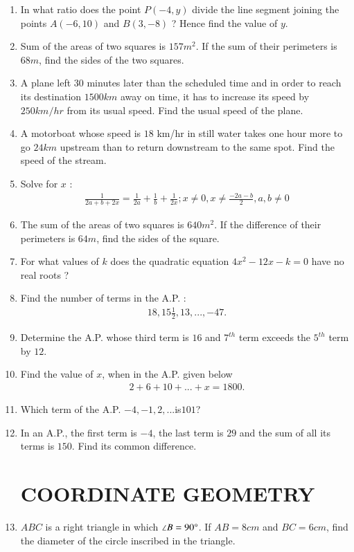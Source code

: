 \documentclass[2pt,-letter paper]{article}
\providecommand{\brak}[1]{\ensuremath{\left(#1\right)}}
\begin{document}
\begin{enumerate}
\item In what ratio does the point $P\brak{- 4, y}$ divide the line segment joining the points $A\brak{- 6, 10}$ and $B\brak{3, - 8}$ ? Hence find the value of $y$.
\item Sum of the areas of two squares is $157 m^2$. If the sum of their perimeters is $68 m$, find the sides of the two squares.
\item A plane left $30$ minutes later than the scheduled time and in order to reach its destination $1500 km$ away on time, it has to increase its speed by $250 km/hr$ from its usual speed. Find the usual speed of the plane.
\item A motorboat whose speed is $18$ km/hr in still water takes one hour more to go $24 km$ upstream than to return downstream to the same spot. Find the speed of the stream.
\item Solve for $x$ :
\begin{align*}
    \frac{1}{2a+ b +2x} = \frac{1}{2a}+\frac{1}{b}+\frac{1}{2x}; x\neq0, x\neq\frac{-2a-b}{2}, a, b\neq0
\end{align*}

\item The sum of the areas of two squares is $640 m^2$. If the difference of their perimeters is $64m$, find the sides of the square.
\item For what values of $k$ does the quadratic equation $4x^2 - 12x - k = 0$ have 
no real roots ?
\item Find the number of terms in the A.P. :
\begin{align*}
    18,15\frac{1}{2},13, ...,-47.
\end{align*}
\item Determine the A.P. whose third term is $16$ and $7^{th}$ term exceeds the $5^{th}$ term by $12$.
\item Find the value of $x$, when in the A.P. given below
\begin{align*}
2 + 6 + 10 + ... + x = 1800.    
\end{align*}
\item Which term of the A.P. $-4, - 1, 2, ... $is$ 101$?
\item In an A.P., the first term is $- 4$, the last term is $29$ and the sum of all its terms is $150$. Find its common difference.

\section{COORDINATE GEOMETRY}
\item $ABC$ is a right triangle in which $\angle B = 90\degree$. If $AB = 8 cm$ and $BC = 6 cm$, find the diameter of the circle inscribed in the triangle.


\end{enumerate}
\end{document}
